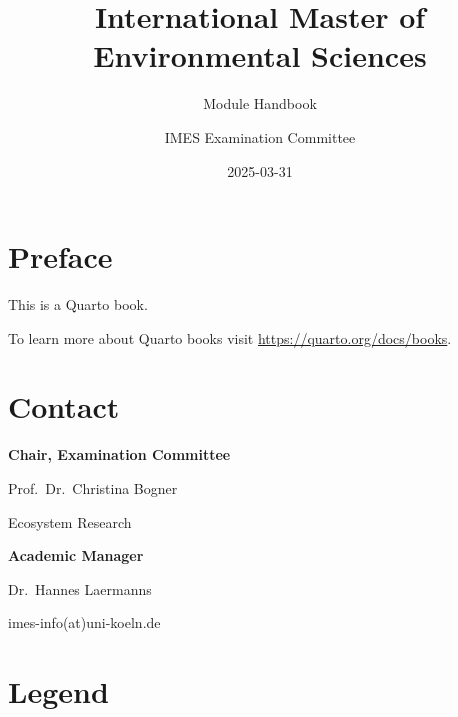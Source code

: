 \documentclass[
  letterpaper,
  10pt,
  openany]{book}
\title{International Master of Environmental Sciences}
\subtitle{Module Handbook}
\author{IMES Examination Committee}
\date{2025-03-31}
\renewcommand*\contentsname{Table of contents}
\newcommand\contentsname{Table of contents}
\begin{document}
\frontmatter
\maketitle

\renewcommand*\contentsname{Table of contents}
{
\setcounter{tocdepth}{0}
\tableofcontents
}

\mainmatter
{}

\chapter*{Preface}\label{preface}


This is a Quarto book.

To learn more about Quarto books visit
\url{https://quarto.org/docs/books}.


\chapter*{Contact}\label{contact}


\textbf{Chair, Examination Committee}

Prof.~Dr.~Christina Bogner

Ecosystem Research

\textbf{Academic Manager}

Dr.~Hannes Laermanns

imes-info(at)uni-koeln.de


\chapter*{Legend}\label{legend}

\end{document}
